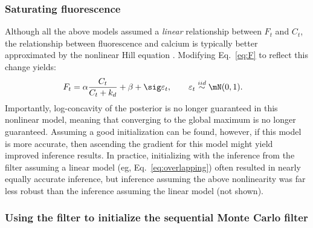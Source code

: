 \subsubsection{Saturating fluorescence}

Although all the above models assumed a \emph{linear} relationship between $F_t$ and $C_t$, the relationship between fluorescence and calcium is typically better approximated by the nonlinear Hill equation \cite{PologrutoSvoboda04}. Modifying Eq.~\eqref{eq:F} to reflect this change yields: 
\begin{align}
	F_t &= \alpha \frac{C_t}{C_t+k_d} + \beta +  \sig \varepsilon_t, \qquad \varepsilon_t \overset{iid}{\sim} \mN(0,1).
\end{align}
Importantly, log-concavity of the posterior is no longer guaranteed in this nonlinear model, meaning that converging to the global maximum is no longer guaranteed.  Assuming a good initialization can be found, however, if this model is more accurate, then ascending the gradient for this model might yield improved inference results.  In practice, initializing with the  inference from the \foopsi filter assuming a linear model (eg, Eq.~\eqref{eq:overlapping}) often resulted in nearly equally accurate inference, but inference assuming the above nonlinearity was far less robust than the inference assuming the linear model (not shown).  

\subsubsection{Using the \foopsi filter to initialize the sequential Monte Carlo filter}

